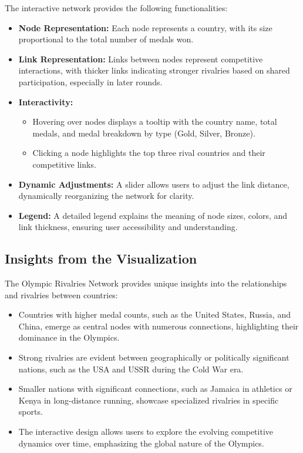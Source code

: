 The interactive network provides the following functionalities:
\begin{itemize}
    \item \textbf{Node Representation:} Each node represents a country, with its size proportional to the total number of medals won.
    \item \textbf{Link Representation:} Links between nodes represent competitive interactions, with thicker links indicating stronger rivalries based on shared participation, especially in later rounds.
    \item \textbf{Interactivity:}
          \begin{itemize}
              \item Hovering over nodes displays a tooltip with the country name, total medals, and medal breakdown by type (Gold, Silver, Bronze).
              \item Clicking a node highlights the top three rival countries and their competitive links.
          \end{itemize}
    \item \textbf{Dynamic Adjustments:} A slider allows users to adjust the link distance, dynamically reorganizing the network for clarity.
    \item \textbf{Legend:} A detailed legend explains the meaning of node sizes, colors, and link thickness, ensuring user accessibility and understanding.
\end{itemize}

\subsection{Insights from the Visualization}

The Olympic Rivalries Network provides unique insights into the relationships and rivalries between countries:
\begin{itemize}
    \item Countries with higher medal counts, such as the United States, Russia, and China, emerge as central nodes with numerous connections, highlighting their dominance in the Olympics.
    \item Strong rivalries are evident between geographically or politically significant nations, such as the USA and USSR during the Cold War era.
    \item Smaller nations with significant connections, such as Jamaica in athletics or Kenya in long-distance running, showcase specialized rivalries in specific sports.
    \item The interactive design allows users to explore the evolving competitive dynamics over time, emphasizing the global nature of the Olympics.
\end{itemize}

